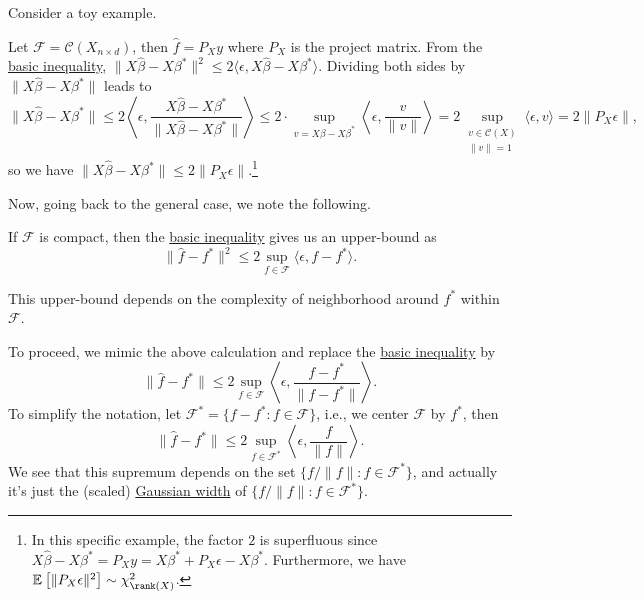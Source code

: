 Consider a toy example.

\begin{eg}
	Let \(\mathscr{F} = \mathcal{C} (X_{n\times d})\), then \(\hat{f} = P_X y\) where \(P_X\) is the project matrix. From the \hyperref[eq:basic-inequality]{basic inequality}, \(\lVert X \hat{\beta} - X \beta ^{\ast}  \rVert ^2 \leq 2 \langle \epsilon , X \hat{\beta} - X \beta ^{\ast} \rangle\). Dividing both sides by \(\lVert X \hat{\beta} - X \beta ^{\ast} \rVert \) leads to
	\[
		\lVert X \hat{\beta} - X \beta ^{\ast} \rVert \leq 2 \left\langle \epsilon , \frac{X \hat{\beta} - X \beta ^{\ast}}{\lVert X \hat{\beta} - X \beta ^{\ast} \rVert } \right\rangle
		\leq 2\cdot \sup _{v = X \beta - X \beta ^{\ast} } \left\langle \epsilon , \frac{v}{\lVert v \rVert } \right\rangle
		= 2 \sup _{\substack{v\in \mathcal{C} (X) \\ \lVert v \rVert = 1}} \langle \epsilon , v \rangle
		= 2 \lVert P_X \epsilon  \rVert,
	\]
	so we have \(\lVert X \hat{\beta} - X \beta ^{\ast} \rVert \leq 2 \lVert P_X \epsilon \rVert \).\footnote{In this specific example, the factor \(2\) is superfluous since \(X \hat{\beta} - X \beta ^{\ast} = P_X y = X \beta ^{\ast} + P_X \epsilon - X \beta ^{\ast} \). Furthermore, we have \(\mathbb{E}_{}\left[ \lVert P_X \epsilon \rVert ^2 \right] \sim \chi ^2_{\rank (X)}\).}
\end{eg}

Now, going back to the general case, we note the following.

\begin{note}
	If \(\mathscr{F} \) is compact, then the \hyperref[eq:basic-inequality]{basic inequality} gives us an upper-bound as
	\[
		\lVert \hat{f} - f^{\ast} \rVert ^2 \leq 2 \sup _{f\in \mathscr{F} } \langle \epsilon , f - f^{\ast} \rangle.
	\]
\end{note}

\begin{intuition}
	This upper-bound depends on the complexity of neighborhood around \(f^{\ast} \) within \(\mathscr{F} \).
\end{intuition}

To proceed, we mimic the above calculation and replace the \hyperref[eq:basic-inequality]{basic inequality} by
\[
	\lVert \hat{f} - f^{\ast} \rVert \leq 2 \sup _{f\in \mathscr{F} } \left\langle \epsilon , \frac{f - f^{\ast} }{\lVert f - f^{\ast} \rVert } \right\rangle .
\]
To simplify the notation, let \(\mathscr{F} ^{\ast} = \{ f - f^{\ast} \colon f \in \mathscr{F} \} \), i.e., we center \(\mathscr{F} \) by \(f^{\ast} \), then
\[
	\lVert \hat{f} - f^{\ast} \rVert \leq 2 \sup _{f\in \mathscr{F} ^{\ast} } \left\langle \epsilon , \frac{f}{\lVert f \rVert } \right\rangle .
\]
We see that this supremum depends on the set \(\{ f / \lVert f \rVert \colon f\in \mathscr{F} ^{\ast} \} \), and actually it's just the (scaled) \hyperref[def:Gaussian-width]{Gaussian width} of \(\{ f / \lVert f \rVert \colon f\in \mathscr{F} ^{\ast} \}\).

